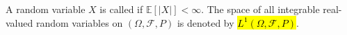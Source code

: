 \begin{definition}
A random variable $X$ is called  if $\mathbb{E}[|X|] < \infty$. The space of all integrable real-valued random variables on $(\Omega, \mathcal{F}, P)$ is denoted by \hl{$L^1(\Omega, \mathcal{F}, P)$}.
\end{definition}

